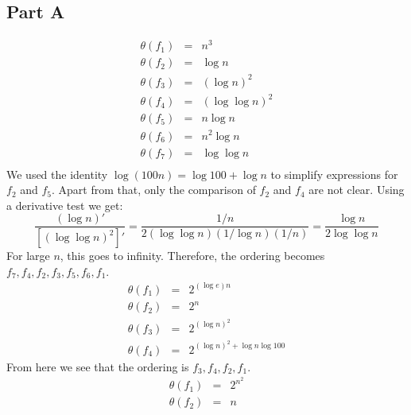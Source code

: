 \documentclass[12pt,twoside]{article}
\begin{document}

\begin{problems}

\section*{Part A}

\problem  %

\begin{problemparts}
\problempart
\begin{eqnarray*}
\theta(f_1) &=& n^3\\
\theta(f_2) &=& \log n\\
\theta(f_3) &=& (\log n)^2\\
\theta(f_4) &=& (\log \log n)^2\\
\theta(f_5) &=& n \log n\\
\theta(f_6) &=& n^2 \log n\\
\theta(f_7) &=& \log \log n\\
\end{eqnarray*}
We used the identity $\log(100 n) = \log 100 + \log n$ to simplify expressions for $f_2$ and $f_5$. Apart from that, only the comparison of $f_2$ and $f_4$ are not clear. Using a derivative test we get:
\begin{equation*}
\frac{(\log n)'}{[(\log \log n)^2]'} = \frac{1/n}{2 (\log \log n) (1/\log n) (1/n)} = \frac{\log n}{2 \log \log n}
\end{equation*}
For large $n$, this goes to infinity. Therefore, the ordering becomes $f_7,f_4,f_2,f_3,f_5,f_6,f_1$. 
\problempart
\begin{eqnarray*}
\theta(f_1) &=& 2^{(\log e) n}\\
\theta(f_2) &=& 2^n\\
\theta(f_3) &=& 2^{(\log n)^2}\\
\theta(f_4) &=& 2^{(\log n)^2 + \log n \log 100}
\end{eqnarray*}
From here we see that the ordering is $f_3, f_4, f_2, f_1$.
\problempart
\begin{eqnarray*}
\theta(f_1) &=& 2^{n^2}\\
\theta(f_2) &=& n\\

\end{eqnarray*}
\end{problemparts}
\end{problems}
\end{document}
